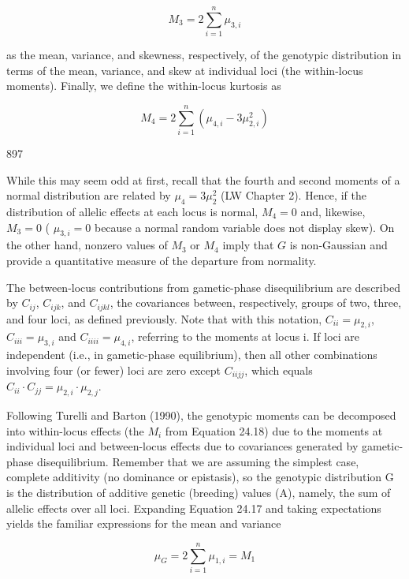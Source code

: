 \documentclass{article}
\begin{document}
\begin{equation}
M_{3}=2\sum_{i=1}^{n}\mu_{3,i}
\tag{24.18c}
\label{eq:24_18c}
\end{equation}

as the mean, variance, and skewness, respectively, of the genotypic distribution in terms of the mean, variance, and skew at individual loci (the within-locus moments). Finally, we define the within-locus kurtosis as

\begin{equation}
M_{4}=2\sum_{i=1}^{n}\left(\mu_{4,i}-3\mu_{2,i}^{2}\right)
\tag{24.18d}
\label{eq:24_18d}
\end{equation}

897

While this may seem odd at first, recall that the fourth and second moments of a normal distribution are related by  $ \mu_4 = 3\mu_2^2 $ (LW Chapter 2). Hence, if the distribution of allelic effects at each locus is normal,  $ M_4 = 0 $ and, likewise,  $ M_3 = 0 $ ( $ \mu_{3,i} = 0 $ because a normal random variable does not display skew). On the other hand, nonzero values of  $ M_3 $ or  $ M_4 $ imply that  $ G $ is non-Gaussian and provide a quantitative measure of the departure from normality.

The between-locus contributions from gametic-phase disequilibrium are described by  $ C_{ij} $,  $ C_{ijk} $, and  $ C_{ijkl} $, the covariances between, respectively, groups of two, three, and four loci, as defined previously. Note that with this notation,  $ C_{ii} = \mu_{2,i} $,  $ C_{iii} = \mu_{3,i} $ and  $ C_{iiii} = \mu_{4,i} $, referring to the moments at locus i. If loci are independent (i.e., in gametic-phase equilibrium), then all other combinations involving four (or fewer) loci are zero except  $ C_{iijj} $, which equals  $ C_{ii} \cdot C_{jj} = \mu_{2,i} \cdot \mu_{2,j} $.

Following Turelli and Barton (1990), the genotypic moments can be decomposed into within-locus effects (the  $ M_{i} $ from Equation 24.18) due to the moments at individual loci and between-locus effects due to covariances generated by gametic-phase disequilibrium. Remember that we are assuming the simplest case, complete additivity (no dominance or epistasis), so the genotypic distribution G is the distribution of additive genetic (breeding) values (A), namely, the sum of allelic effects over all loci. Expanding Equation 24.17 and taking expectations yields the familiar expressions for the mean and variance

\begin{equation}
\mu_{G}=2\sum_{i=1}^{n}\mu_{1,i}=M_{1}
\tag{24.19a}
\label{eq:24_19a}
\end{equation}
\end{document}
